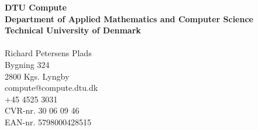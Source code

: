 
\thispagestyle{empty} %
\frieze
\vspace*{\fill}
\noindent
\sffamily
\scriptsize
\textbf{DTU Compute}\\
\textbf{Department of Applied Mathematics and Computer Science}\\
\textbf{Technical University of Denmark}\\
\\
Richard Petersens Plads\\
Bygning 324\\
2800 Kgs. Lyngby\\
compute@compute.dtu.dk\\
+45 4525 3031\\
CVR-nr. 30 06 09 46\\
EAN-nr. 5798000428515
\normalsize
\normalfont
\vspace*{2.5cm}
